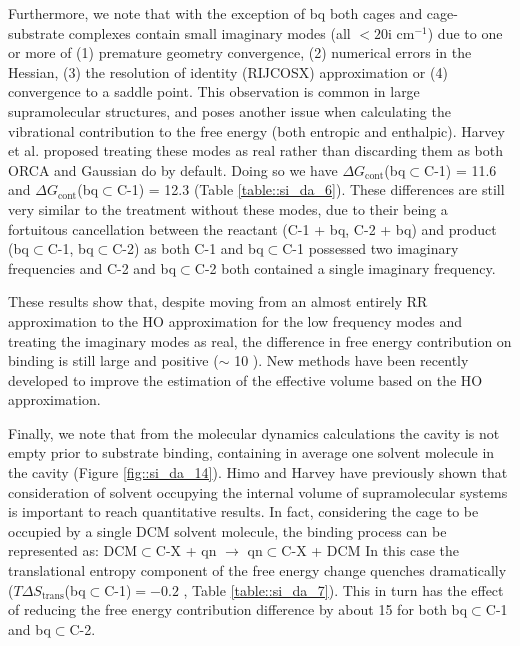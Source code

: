 \documentclass[../../main.tex]{subfiles}
\begin{document}
Furthermore, we note that with the exception of bq both cages and cage-substrate complexes contain small imaginary modes (all $< 20$i cm$^{-1}$) due to one or more of (1) premature geometry convergence, (2) numerical errors in the Hessian, (3) the resolution of identity (RIJCOSX) approximation or (4) convergence to a saddle point. This observation is common in large supramolecular structures,\cite{Daver2017} and poses another issue when calculating the vibrational contribution to the free energy (both entropic and enthalpic). Harvey et al. proposed treating these modes as real rather than discarding them as both ORCA and Gaussian do by default. Doing so we have $\Delta G_\text{cont}$(bq$\subset$C-1) = 11.6 \kcalx and $\Delta G_\text{cont}$(bq$\subset$C-1) = 12.3 \kcalx (Table \ref{table::si_da_6}). These differences are still very similar to the treatment without these modes, due to their being a fortuitous cancellation between the reactant (C-1 + bq, C-2 + bq) and product (bq$\subset$C-1, bq$\subset$C-2) as both C-1 and bq$\subset$C-1 possessed two imaginary frequencies and C-2 and bq$\subset$C-2 both contained a single imaginary frequency.

These results show that, despite moving from an almost entirely RR approximation to the HO approximation for the low frequency modes and treating the imaginary modes as real, the difference in free energy contribution on binding is still large and positive ($\sim$ 10 \kcal). New methods have been recently developed to improve the estimation of the effective volume based on the HO approximation.\cite{Tarumi2018, Nakai2014}

Finally, we note that from the molecular dynamics calculations the cavity is not empty prior to substrate binding, containing in average one solvent molecule in the cavity (Figure \ref{fig::si_da_14}). Himo and Harvey have previously shown that consideration of solvent occupying the internal volume of supramolecular systems is important to reach quantitative results.\cite{Daver2017} In fact, considering the cage to be occupied by a single DCM solvent molecule, the binding process can be represented as:
DCM$\subset$C-X + qn $\rightarrow$ qn$\subset$C-X + DCM
In this case the translational entropy component of the free energy change quenches dramatically ($T\Delta S_\text{trans}$(bq$\subset$C-1)$ = -0.2$ \kcal, Table \ref{table::si_da_7}). This in turn has the effect of reducing the free energy contribution difference by about 15 \kcalx for both bq$\subset$C-1 and bq$\subset$C-2. 
\end{document}
